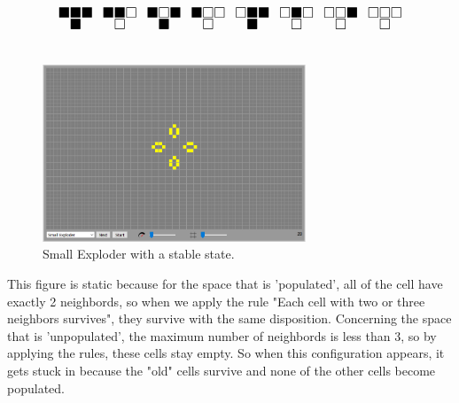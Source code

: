 \documentclass[11pt]{article}
\begin{document}
\[ \LARGE
\substack{\blacksquare \blacksquare \blacksquare \\ \blacksquare} \enspace
\substack{\blacksquare \blacksquare \square \\ \square} \enspace
\substack{\blacksquare \square \blacksquare \\ \blacksquare } \enspace
\substack{\blacksquare \square \square \\ \square} \enspace
\substack{\square \blacksquare \blacksquare \\ \blacksquare} \enspace
\substack{\square \blacksquare \square \\ \square} \enspace
\substack{\square \square \blacksquare \\ \square} \enspace
\substack{\square \square \square \\ \square}
\]

\section{}
\begin{figure}[H]
	\centering
	\includegraphics[width=0.7\textwidth]{images/q6.PNG}
	\caption{Small Exploder with a stable state.}
\end{figure}
This figure is static because for the space that is 'populated', all of the cell have exactly 2 neighbords, so when we apply the rule "Each cell with two or three neighbors survives", they survive with the same disposition.
Concerning the space that is 'unpopulated', the maximum number of neighbords is less than 3, so by applying the rules, these cells stay empty. 
So when this configuration appears, it gets stuck in because the "old" cells survive and none of the other cells become populated. 
\end{document}
